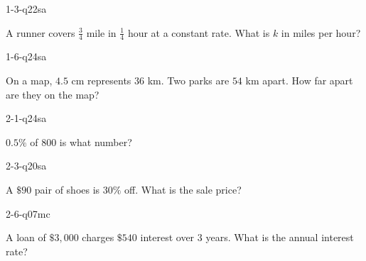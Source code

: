 
\begin{practiceQuestion}{1-3-q22}{sa}
\begin{questionText}
A runner covers $\frac{3}{4}$ mile in $\frac{1}{4}$ hour at a constant rate. What is $k$ in miles per hour?
\end{questionText}
\end{practiceQuestion}

\begin{practiceQuestion}{1-6-q24}{sa}
\begin{questionText}
On a map, $4.5$ cm represents $36$ km. Two parks are $54$ km apart. How far apart are they on the map?
\end{questionText}
\end{practiceQuestion}

\begin{practiceQuestion}{2-1-q24}{sa}
\begin{questionText}
$0.5\%$ of $800$ is what number?
\end{questionText}
\end{practiceQuestion}

\begin{practiceQuestion}{2-3-q20}{sa}
\begin{questionText}
A $\$90$ pair of shoes is $30\%$ off. What is the sale price?
\end{questionText}
\end{practiceQuestion}

\begin{practiceQuestion}{2-6-q07}{mc}
\begin{questionText}
A loan of $\$3{,}000$ charges $\$540$ interest over $3$ years. What is the annual interest rate?
\end{questionText}
\end{practiceQuestion}

